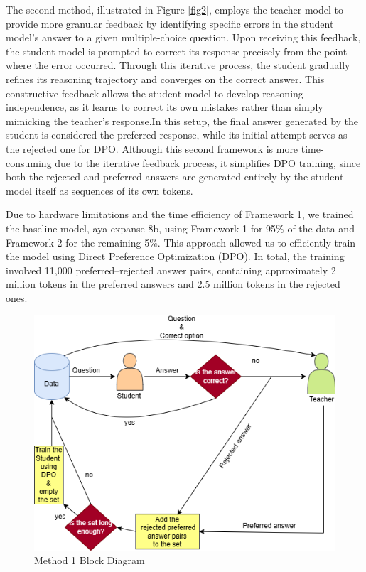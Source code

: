 \documentclass[conference]{IEEEtran}
\begin{document}
The second method, illustrated in Figure \ref{fig2}, employs the teacher model to provide more granular feedback by identifying specific errors in the student model’s answer to a given multiple-choice question. Upon receiving this feedback, the student model is prompted to correct its response precisely from the point where the error occurred.  Through this iterative process, the student gradually refines its reasoning trajectory and converges on the correct answer.  
This constructive feedback allows the student model to develop reasoning independence, as it learns to correct its own mistakes rather than simply mimicking the teacher’s response.In this setup, the final answer generated by the student is considered the preferred response, while its initial attempt serves as the rejected one for DPO.  
Although this second framework is more time-consuming due to the iterative feedback process, it simplifies DPO training, since both the rejected and preferred answers are generated entirely by the student model itself as sequences of its own tokens.

Due to hardware limitations and the time efficiency of Framework 1, we trained the baseline model, aya-expanse-8b, using Framework 1 for 95\% of the data and Framework 2 for the remaining 5\%. This approach allowed us to efficiently train the model using Direct Preference Optimization (DPO). In total, the training involved 11,000 preferred–rejected answer pairs, containing approximately 2 million tokens in the preferred answers and 2.5 million tokens in the rejected ones.
\begin{figure}[h]
    \centering
    \includegraphics[width=1.0\linewidth]{fig1.png}
    \caption{Method 1 Block Diagram}
    \label{fig1}
\end{figure}
\end{document}
